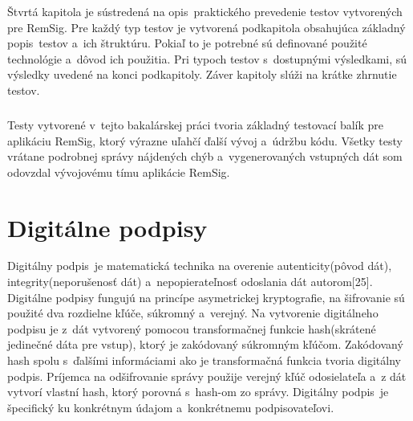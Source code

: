 \documentclass[
  printed, %
  notable,   %
  nolof,     %
    oneside,       %
  nolot,     %
]{fithesis3}
\begin{document}
Štvrtá kapitola je sústredená na opis~praktického prevedenie  testov vytvorených pre RemSig. Pre každý typ testov je vytvorená podkapitola obsahujúca základný popis~testov a~ich štruktúru. Pokiaľ to je potrebné sú definované použité technológie a~dôvod ich použitia. Pri typoch testov s~dostupnými výsledkami, sú výsledky uvedené na konci podkapitoly. Záver kapitoly slúži na krátke zhrnutie testov.\paragraph{}
Testy vytvorené v~tejto bakalárskej práci tvoria základný testovací balík pre aplikáciu RemSig, ktorý výrazne uľahčí ďalší vývoj a~údržbu kódu. Všetky testy vrátane podrobnej správy nájdených chýb a~vygenerovaných vstupných dát som odovzdal vývojovému tímu aplikácie RemSig.
\chapter{Digitálne podpisy}
Digitálny podpis~je matematická technika na overenie autenticity(pôvod dát), integrity(neporušenosť dát) a~nepopierateľnosť odoslania dát autorom[25].  Digitálne podpisy fungujú na princípe asymetrickej kryptografie, na šifrovanie sú použité dva rozdielne kľúče, súkromný a~verejný. Na vytvorenie digitálneho podpisu je z~dát vytvorený pomocou transformačnej funkcie  hash(skrátené jedinečné dáta pre vstup), ktorý je zakódovaný súkromným kľúčom. Zakódovaný hash spolu s~ďalšími informáciami ako je transformačná funkcia  tvoria digitálny podpis. Príjemca na odšifrovanie  správy použije verejný kľúč odosielateľa a~z dát vytvorí vlastní hash, ktorý porovná s~hash-om zo správy.  Digitálny podpis~je špecifický ku konkrétnym údajom a~konkrétnemu podpisovateľovi.
\end{document}
